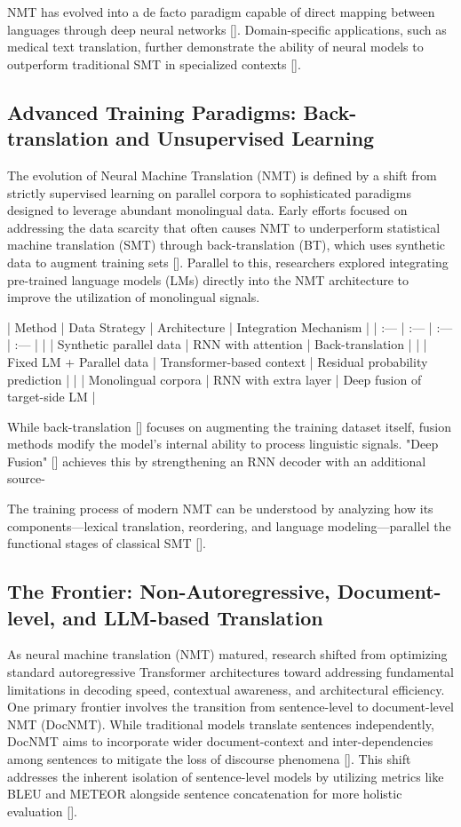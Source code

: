 \documentclass[11pt]{article}
\begin{document}
NMT has evolved into a de facto paradigm capable of direct mapping between languages through deep neural networks [\citep{2004.05809}]. Domain-specific applications, such as medical text translation, further demonstrate the ability of neural models to outperform traditional SMT in specialized contexts [\citep{1509.08644}].
\subsection{Advanced Training Paradigms: Back-translation and Unsupervised Learning}

The evolution of Neural Machine Translation (NMT) is defined by a shift from strictly supervised learning on parallel corpora to sophisticated paradigms designed to leverage abundant monolingual data. Early efforts focused on addressing the data scarcity that often causes NMT to underperform statistical machine translation (SMT) through back-translation (BT), which uses synthetic data to augment training sets [\citep{1804.06189}]. Parallel to this, researchers explored integrating pre-trained language models (LMs) directly into the NMT architecture to improve the utilization of monolingual signals.

| Method | Data Strategy | Architecture | Integration Mechanism |
| :--- | :--- | :--- | :--- |
| \citep{1804.06189} | Synthetic parallel data | RNN with attention | Back-translation |
| \citep{1809.00125} | Fixed LM + Parallel data | Transformer-based context | Residual probability prediction |
| \citep{1903.11437} | Monolingual corpora | RNN with extra layer | Deep fusion of target-side LM |

While back-translation [\citep{1804.06189}] focuses on augmenting the training dataset itself, fusion methods modify the model's internal ability to process linguistic signals. "Deep Fusion" [\citep{1903.11437}] achieves this by strengthening an RNN decoder with an additional source-

The training process of modern NMT can be understood by analyzing how its components—lexical translation, reordering, and language modeling—parallel the functional stages of classical SMT [\citep{2109.01396}].
\subsection{The Frontier: Non-Autoregressive, Document-level, and LLM-based Translation}

As neural machine translation (NMT) matured, research shifted from optimizing standard autoregressive Transformer architectures toward addressing fundamental limitations in decoding speed, contextual awareness, and architectural efficiency. One primary frontier involves the transition from sentence-level to document-level NMT (DocNMT). While traditional models translate sentences independently, DocNMT aims to incorporate wider document-context and inter-dependencies among sentences to mitigate the loss of discourse phenomena [\citep{1912.08494}]. This shift addresses the inherent isolation of sentence-level models by utilizing metrics like BLEU and METEOR alongside sentence concatenation for more holistic evaluation [\citep{1912.08494}].
\end{document}
